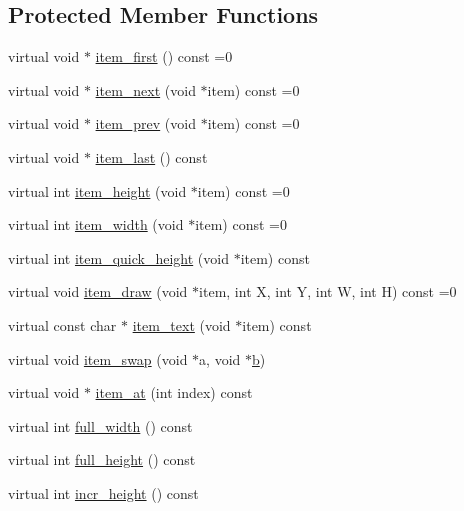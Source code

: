 \subsection*{Protected Member Functions}
\begin{DoxyCompactItemize}
\item 
virtual void $\ast$ \hyperlink{class_fl___browser___a43dd6231f2684f132a5a33b5d7d0c8e7}{item\+\_\+first} () const =0
\item 
virtual void $\ast$ \hyperlink{class_fl___browser___aca6035552f5e9ecbeaa6caaf5fb8a3cb}{item\+\_\+next} (void $\ast$item) const =0
\item 
virtual void $\ast$ \hyperlink{class_fl___browser___afeb24ca0dbd8e4685fa18382512c94d3}{item\+\_\+prev} (void $\ast$item) const =0
\item 
virtual void $\ast$ \hyperlink{class_fl___browser___a2302bec54f4ea593146be5490a7fe93b}{item\+\_\+last} () const
\item 
virtual int \hyperlink{class_fl___browser___a5487d8f8d3e9cce3e87918f8f53e6ae6}{item\+\_\+height} (void $\ast$item) const =0
\item 
virtual int \hyperlink{class_fl___browser___a3b84b5418ac2554dfaaeb50cfba63569}{item\+\_\+width} (void $\ast$item) const =0
\item 
virtual int \hyperlink{class_fl___browser___aa9f378038994076e866daac8ca050507}{item\+\_\+quick\+\_\+height} (void $\ast$item) const
\item 
virtual void \hyperlink{class_fl___browser___ad145a5000b8ec78a45270a1d9294aa15}{item\+\_\+draw} (void $\ast$item, int X, int Y, int W, int H) const =0
\item 
virtual const char $\ast$ \hyperlink{class_fl___browser___afe9e25c3ea0c73dcba379e7a46efaddb}{item\+\_\+text} (void $\ast$item) const
\item 
virtual void \hyperlink{class_fl___browser___a52451c9082450cfb259e9e5b06344387}{item\+\_\+swap} (void $\ast$a, void $\ast$\hyperlink{forms_8_h_a0ba06a290a384fa06b1b90745827dae2}{b})
\item 
virtual void $\ast$ \hyperlink{class_fl___browser___a6dd51e0b34953ddb1de33a750ab07c22}{item\+\_\+at} (int index) const
\item 
virtual int \hyperlink{class_fl___browser___a1a15e2abc969d5958d5ca0d7ae2d412b}{full\+\_\+width} () const
\item 
virtual int \hyperlink{class_fl___browser___a16a8a583c790f87f852c6d10413e9592}{full\+\_\+height} () const
\item 
virtual int \hyperlink{class_fl___browser___aff44d1df61b13c4ef50636dc7e140cb3}{incr\+\_\+height} () const

\end{DoxyCompactItemize}
